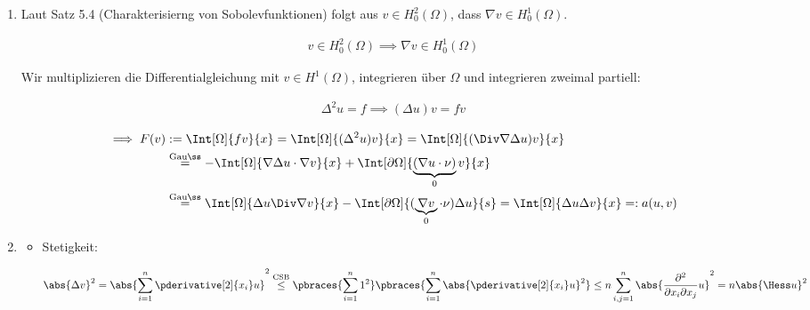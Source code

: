\begin{solution}

\phantom{}

\begin{enumerate}[label = (\alph*)]

  \item Laut Satz 5.4 (Charakterisierng von Sobolevfunktionen) folgt aus $v \in H_0^2(\Omega)$, dass $\nabla v \in H_0^1(\Omega)$.
  
  \begin{align*}
    v \in H_0^2(\Omega)
    \implies
    \nabla v \in H_0^1(\Omega)
  \end{align*}

  Wir multiplizieren die Differentialgleichung mit $v \in H^1(\Omega)$, integrieren über $\Omega$ und integrieren zweimal partiell:

  \begin{align*}
    \Delta^2 u = f
    \implies
    (\Delta u) v = f v
  \end{align*}

  \begin{align*}
    \implies
    F(v)
    & :=
    \Int[\Omega]{f v}{x}
    =
    \Int[\Omega]{(\Delta^2 u) v}{x}
    =
    \Int[\Omega]{(\Div \nabla \Delta u) v}{x} \\
    & \stackrel
    {
      \mathrm{Gauß}
    }{=}
    -\Int[\Omega]{\nabla \Delta u \cdot \nabla v}{x}
    +
    \Int[\partial \Omega]{\underbrace{(\nabla u \cdot \nu)}_0 v}{x} \\
    & \stackrel
    {
      \mathrm{Gauß}
    }{=}
    \Int[\Omega]{\Delta u \Div \nabla v}{x}
    -
    \Int[\partial \Omega]{(\underbrace{\nabla v}_0 \cdot \nu) \Delta u}{s}
    =
    \Int[\Omega]{\Delta u \Delta v}{x}
    =:
    a(u, v)
  \end{align*}

  \item

  \begin{itemize}
    \item Stetigkeit:
    
    \begin{align*}
      \abs{\Delta v}^2
      =
      \abs
      {
        \sum_{i=1}^n
        \pderivative[2]{x_i} u
      }^2
      \stackrel
      {
        \mathrm{CSB}
      }{\leq}
      \pbraces
      {
        \sum_{i=1}^n
        1^2
      }
      \pbraces
      {
        \sum_{i=1}^n
        \abs{\pderivative[2]{x_i} u}^2
      }
      \leq
      n
      \sum_{i,j=1}^n
      \abs
      {
        \frac{\partial^2}{\partial x_i \partial x_j} u
      }^2
      =
      n \abs{\Hess u}^2
    \end{align*}
    

\end{itemize}
\end{enumerate}
\end{solution}
